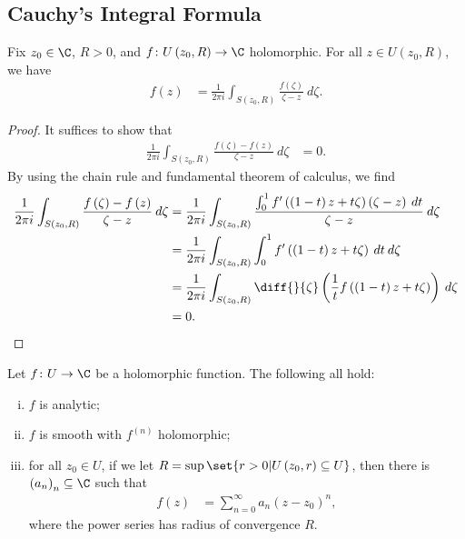 \documentclass[10pt]{mypackage}
\begin{document}
\subsection{Cauchy's Integral Formula}%
\begin{proposition}
  Fix $z_0\in \C$, $R > 0$, and $f\colon U\left( z_0,R \right)\rightarrow \C$ holomorphic. For all $z\in U\left( z_0,R \right)$, we have
  \begin{align*}
    f(z) &= \frac{1}{2\pi i} \int_{S\left( z_0,R \right)}^{} \frac{f\left( \zeta \right)}{\zeta - z}\:d\zeta.
  \end{align*}
\end{proposition}
\begin{proof}
  It suffices to show that
  \begin{align*}
    \frac{1}{2\pi i} \int_{S\left( z_0,R \right)}^{} \frac{f\left( \zeta \right)-f\left( z \right)}{\zeta - z}\:d\zeta &= 0.
  \end{align*}
  By using the chain rule and fundamental theorem of calculus, we find
  \begin{align*}
    \frac{1}{2\pi i} \int_{S\left( z_0,R \right)}^{} \frac{f\left( \zeta \right)-f\left( z \right)}{\zeta - z}\:d\zeta &= \frac{1}{2\pi i}\int_{S\left( z_0,R \right)}^{} \frac{ \int_{0}^{1} f'\left( \left( 1-t \right)z + t\zeta \right)\left( \zeta - z \right)\:dt }{\zeta - z}\:d\zeta\\
                                                                                                                       &= \frac{1}{2\pi i} \int_{S\left( z_0,R \right)}^{} \int_{0}^{1} f'\left( \left( 1-t \right)z + t\zeta \right)\:dt \:d\zeta\\
                                                                                                                       &= \frac{1}{2\pi i} \int_{S\left( z_0,R \right)}^{} \diff{}{\zeta}\left( \frac{1}{t}f\left( \left( 1-t \right)z + t\zeta \right) \right)\:d\zeta\\
                                                                                                                       &= 0.
  \end{align*}
\end{proof}
\begin{proposition}
  Let $f\colon U\rightarrow \C$ be a holomorphic function. The following all hold:
  \begin{enumerate}[(i)]
    \item $f$ is analytic;
    \item $f$ is smooth with $f^{(n)}$ holomorphic;
    \item for all $z_0\in U$, if we let $R = \sup\set{r > 0 | U\left( z_0,r \right)\subseteq U}$, then there is $\left( a_n \right)_n\subseteq \C$ such that
      \begin{align*}
        f\left( z \right) &= \sum_{n=0}^{\infty} a_n\left( z-z_0 \right)^{n},
      \end{align*}
      where the power series has radius of convergence $R$.
  \end{enumerate}
\end{proposition}
\end{document}
